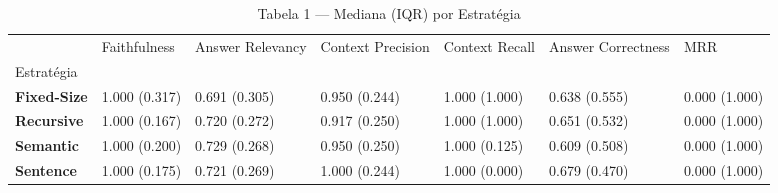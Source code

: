 \begin{table}
\caption{Tabela 1 — Mediana (IQR) por Estratégia}
\label{tab:summary}
\begin{tabular}{lllllll}
\toprule
 & Faithfulness & Answer Relevancy & Context Precision & Context Recall & Answer Correctness & MRR \\
Estratégia &  &  &  &  &  &  \\
\midrule
\textbf{Fixed-Size} & 1.000 (0.317) & 0.691 (0.305) & 0.950 (0.244) & 1.000 (1.000) & 0.638 (0.555) & 0.000 (1.000) \\
\textbf{Recursive} & 1.000 (0.167) & 0.720 (0.272) & 0.917 (0.250) & 1.000 (1.000) & 0.651 (0.532) & 0.000 (1.000) \\
\textbf{Semantic} & 1.000 (0.200) & 0.729 (0.268) & 0.950 (0.250) & 1.000 (0.125) & 0.609 (0.508) & 0.000 (1.000) \\
\textbf{Sentence} & 1.000 (0.175) & 0.721 (0.269) & 1.000 (0.244) & 1.000 (0.000) & 0.679 (0.470) & 0.000 (1.000) \\
\bottomrule
\end{tabular}
\end{table}
